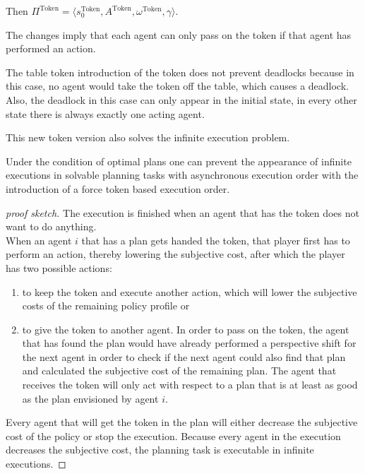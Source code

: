 Then $ \Pi^{\text{Token}} = \langle s_0^{\text{Token}}, A ^{\text{Token}}, \omega ^{\text{Token}}, \gamma \rangle $.

The changes imply that each agent can only pass on the token if that agent has performed an action.

The table token introduction of the token does not prevent deadlocks because in this case, no agent would take the token off the table, which causes a deadlock. Also, the deadlock in this case can only appear in the initial state, in every other state there is always exactly one acting agent.

This new token version also solves the infinite execution problem.

\begin{theorem}
  Under the condition of optimal plans one can prevent the appearance of infinite executions in solvable planning tasks with asynchronous execution order with the introduction of a force token based execution order.
\end{theorem}



\begin{proof}[proof sketch]
  The execution is finished when an agent that has the token does not want to do anything. \\
  When an agent $i$ that has a plan gets handed the token, that player first has to perform an action, thereby lowering the subjective cost, after which the player has two possible actions:
  \begin{enumerate}
    \item to keep the token and execute another action, which will lower the subjective costs of the remaining policy profile or
    \item to give the token to another agent. In order to pass on the token, the agent that has found the plan would have already performed a perspective shift for the next agent in order to check if the next agent could also find that plan and calculated the subjective cost of the remaining plan. The agent that receives the token will only act with respect to a plan that is at least as good as the plan envisioned by agent $i$.
  \end{enumerate}
  Every agent that will get the token in the plan will either decrease the subjective cost of the policy or stop the execution. Because every agent in the execution decreases the subjective cost, the planning task is executable in infinite executions.
\end{proof}

